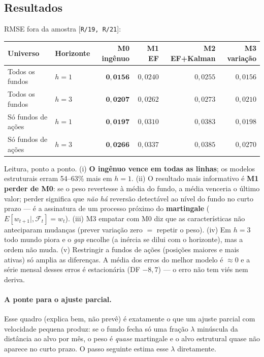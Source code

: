 \documentclass[11pt,a4paper]{article}
\newcommand{\scriptref}[1]{{\footnotesize\color{cinza}[\texttt{#1}]}}
\begin{document}
\subsection{Resultados}

RMSE fora da amostra \scriptref{R/19, R/21}:

\begin{center}\small
\begin{tabular}{@{}llrrrr@{}}
\toprule
Universo & Horizonte & M0 ingênuo & M1 EF & M2 EF+Kalman & M3 variação \\
\midrule
Todos os fundos & $h=1$ & $\mathbf{0{,}0156}$ & $0{,}0240$ & $0{,}0255$ & $0{,}0156$ \\
Todos os fundos & $h=3$ & $\mathbf{0{,}0207}$ & $0{,}0262$ & $0{,}0273$ & $0{,}0210$ \\
Só fundos de ações & $h=1$ & $\mathbf{0{,}0197}$ & $0{,}0310$ & $0{,}0383$ & $0{,}0198$ \\
Só fundos de ações & $h=3$ & $\mathbf{0{,}0266}$ & $0{,}0337$ & $0{,}0385$ & $0{,}0270$ \\
\bottomrule
\end{tabular}
\end{center}

Leitura, ponto a ponto. (i) \textbf{O ingênuo vence em todas as linhas}; os modelos estruturais
erram 54--63\% mais em $h=1$. (ii) O resultado mais informativo é \textbf{M1 perder de M0}: se o
peso revertesse à média do fundo, a média venceria o último valor; perder significa que \emph{não
há} reversão detectável ao nível do fundo no curto prazo --- é a assinatura de um processo próximo
do \textbf{martingale} ($E[w_{t+1}|,\mathcal F_t]=w_t$). (iii) M3 empatar com M0 diz que as
características não anteciparam mudanças (prever variação zero $=$ repetir o peso). (iv) Em $h=3$
todo mundo piora e o \emph{gap} encolhe (a inércia se dilui com o horizonte), mas a ordem não
muda. (v) Restringir a fundos de ações (posições maiores e mais ativas) só amplia as diferenças.
A média dos erros do melhor modelo é $\approx0$ e a série mensal desses erros é estacionária
(DF $-8{,}7$) --- o erro não tem viés nem deriva.

\paragraph{A ponte para o ajuste parcial.} Esse quadro (explica bem, não prevê) é exatamente o
que um ajuste parcial com velocidade pequena produz: se o fundo fecha só uma fração $\lambda$
minúscula da distância ao alvo por mês, o peso é \emph{quase} martingale e o alvo estrutural quase
não aparece no curto prazo. O passo seguinte estima esse $\lambda$ diretamente.
\end{document}
